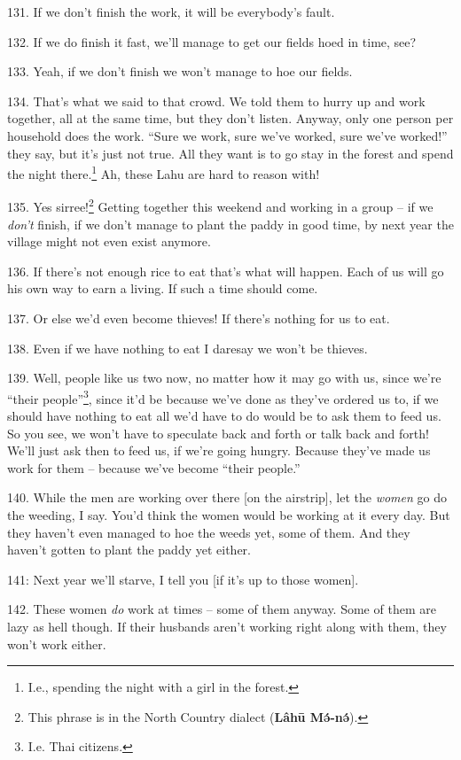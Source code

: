 131. If we don't finish the work, it will be everybody's fault.

132. If we do finish it fast, we'll manage to get our fields hoed in time, see?

133. Yeah, if we don't finish we won't manage to hoe our fields.

134. That's what we said to that crowd. We told them to hurry up and work together,
all at the same time, but they don't listen. Anyway, only one person per household
does the work. ``Sure we work, sure we've worked, sure we've worked!''
they say, but it's just not true. All they want is to go stay in the forest and
spend the night there.\footnote{I.e., spending the night with a girl in the forest.} Ah, these Lahu are hard to reason with!

135. Yes sirree!\footnote{This phrase is in the North Country dialect (\textbf{Lâhū Mə́-nə́}).} Getting together this weekend and working in a group -- if
we\textit{ don't} finish, if we don't manage to plant the paddy in good time, by
next year the village might not even exist anymore.

136. If there's not enough rice to eat that's what will happen. Each of us will
go his own way to earn a living. If such a time should come.

137. Or else we'd even become thieves! If there's nothing for us to eat.

138. Even if we have nothing to eat I daresay we won't be thieves.

139. Well, people like us two now, no matter how it may go with us, since we're
``their people''\footnote{I.e. Thai citizens.}, since it'd be because we've done as they've ordered us to,
if we should have nothing to eat all we'd have to do would be to ask them to feed
us. So you see, we won't have to speculate back and forth or talk back and forth!
We'll just ask then to feed us, if we're going hungry. Because they've made us
work for them -- because we've become ``their people.''

140. While the men are working over there [on the airstrip], let the \textit{women
}go do the weeding, I say. You'd think the women would be working at it every day.
But they haven't even managed to hoe the weeds yet, some of them. And they haven't
gotten to plant the paddy yet either.

 141: Next year we'll starve, I tell you [if it's up
to those women].


142. These women \textit{do} work at times -- some of them anyway. Some of them
are lazy as hell though. If their husbands aren't working right along with them,
they won't work either.


